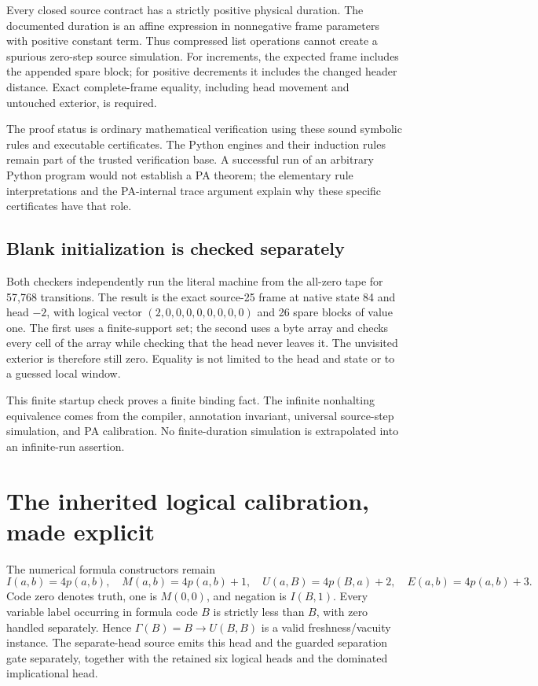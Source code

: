 \documentclass[11pt,letterpaper]{article}
\begin{document}
Every closed source contract has a strictly positive physical duration.
The documented duration is an affine expression in nonnegative frame
parameters with positive constant term. Thus compressed list operations
cannot create a spurious zero-step source simulation. For increments,
the expected frame includes the appended spare block; for positive
decrements it includes the changed header distance. Exact complete-frame
equality, including head movement and untouched exterior, is required.

The proof status is ordinary mathematical verification using these sound
symbolic rules and executable certificates. The Python engines and their
induction rules remain part of the trusted verification base. A successful
run of an arbitrary Python program would not establish a PA theorem;
the elementary rule interpretations and the PA-internal trace argument
explain why these specific certificates have that role.

\subsection{Blank initialization is checked separately}

Both checkers independently run the literal machine from the all-zero
tape for 57,768 transitions. The result is the exact source-25 frame at
native state 84 and head $-2$, with logical vector
$(2,0,0,0,0,0,0,0,0)$ and 26 spare blocks of value one.
The first uses a finite-support set; the second uses a byte array and
checks every cell of the array while checking that the head never leaves
it. The unvisited exterior is therefore still zero. Equality is not
limited to the head and state or to a guessed local window.

This finite startup check proves a finite binding fact. The infinite
nonhalting equivalence comes from the compiler, annotation invariant,
universal source-step simulation, and PA calibration. No finite-duration
simulation is extrapolated into an infinite-run assertion.

\section{The inherited logical calibration, made explicit}
\label{sec:inherited}

The numerical formula constructors remain
\[
 I(a,b)=4p(a,b),\quad M(a,b)=4p(a,b)+1,\quad
 U(a,B)=4p(B,a)+2,\quad E(a,b)=4p(a,b)+3.
\]
Code zero denotes truth, one is $M(0,0)$, and negation is $I(B,1)$.
Every variable label occurring in formula code $B$ is strictly less than
$B$, with zero handled separately. Hence
$\Gamma(B)=B\to U(B,B)$ is a valid freshness/vacuity instance.
The separate-head source emits this head and the guarded separation gate
separately, together with the retained six logical heads and the dominated
implicational head.
\end{document}
